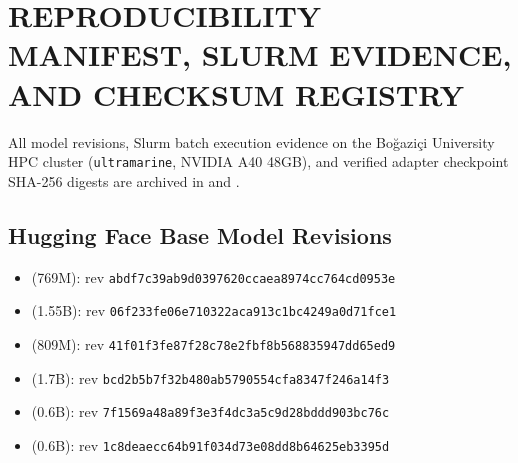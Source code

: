 \documentclass[a4paper,12pt]{report}
\begin{document}
\chapter{REPRODUCIBILITY MANIFEST, SLURM EVIDENCE, AND CHECKSUM REGISTRY}
\label{app:repro}

All model revisions, Slurm batch execution evidence on the Bo\u{g}azi\c{c}i University HPC cluster (\texttt{ultramarine}, NVIDIA A40 48GB), and verified adapter checkpoint SHA-256 digests are archived in  and .

\section{Hugging Face Base Model Revisions}
\begin{sloppypar}
\begin{itemize}
    \item {} (769M): rev \footnotesize\texttt{abdf7c39ab9d0397620ccaea8974cc764cd0953e}\normalsize
    \item {} (1.55B): rev \footnotesize\texttt{06f233fe06e710322aca913c1bc4249a0d71fce1}\normalsize
    \item {} (809M): rev \footnotesize\texttt{41f01f3fe87f28c78e2fbf8b568835947dd65ed9}\normalsize
    \item {} (1.7B): rev \footnotesize\texttt{bcd2b5b7f32b480ab5790554cfa8347f246a14f3}\normalsize
    \item {} (0.6B): rev \footnotesize\texttt{7f1569a48a89f3e3f4dc3a5c9d28bddd903bc76c}\normalsize
    \item {} (0.6B): \newline rev \footnotesize\texttt{1c8deaecc64b91f034d73e08dd8b64625eb3395d}\normalsize
\end{itemize}
\end{sloppypar}
\end{document}
